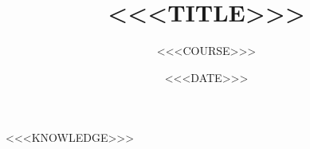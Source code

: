 \documentclass[11pt]{ctexart}
\title{<<<TITLE>>>}
\author{<<<COURSE>>>}
\date{<<<DATE>>>}
\begin{document}
\maketitle
\tableofcontents
\bigskip

<<<KNOWLEDGE>>>
\end{document}
